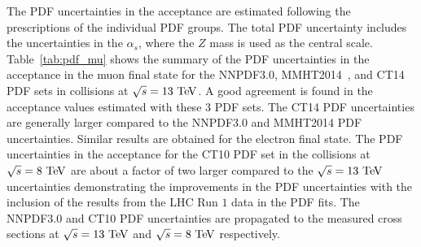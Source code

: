 The PDF uncertainties in the acceptance are estimated following the prescriptions of the individual PDF groups. The total PDF uncertainty includes the  uncertainties in the $\alpha_s$, where the $Z$ mass is used as the central scale.  Table~\ref{tab:pdf_mu} shows the summary of the PDF uncertainties in the acceptance in the muon final state for the NNPDF3.0, MMHT2014~\cite{Harland-Lang:2014zoa}, and CT14~\cite{Dulat:2015mca} PDF sets in collisions at $\sqrt{s}=13~\TeV$. A good agreement is found in the acceptance values estimated with these $3$ PDF sets. The CT14 PDF uncertainties are generally larger compared to the NNPDF3.0 and MMHT2014 PDF uncertainties. Similar results are obtained for the electron final state. The PDF uncertainties in the acceptance for the CT10 PDF set in the collisions at $\sqrt{s}=8~\mathrm{Te\kern -0.1em V}$ are about a factor of two larger compared to the $\sqrt{s}=13~\TeV$ uncertainties demonstrating the improvements in the PDF uncertainties with the inclusion of the results from the LHC Run $1$ data in the PDF fits. The NNPDF3.0 and CT10 PDF uncertainties are propagated to the measured cross sections at $\sqrt{s}=13~\TeV$ and $\sqrt{s}=8~\mathrm{Te\kern -0.1em V}$ respectively.     
\begin{table}[htbp]
\begin{center}
\caption{The summary of the theoretical uncertainties in the acceptance values in the electron final state in collisions at $\sqrt{s}=13~\TeV$. The uncertainties due to higher order QCD contributions, PDFs, FSR modeling, and missing EWK contributions are shown.}
\label{tab_el}
\end{center}
\end{table}

